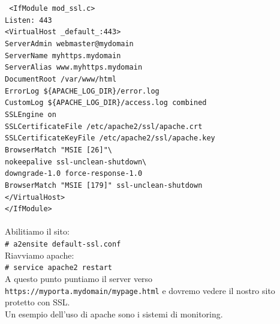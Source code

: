 \documentclass[a4paper]{report}
\newcommand\tab[1][1cm]{\hspace*{#1}}
\begin{document}
\texttt{
\tab <IfModule mod\_ssl.c>\\
\tab\tab Listen: 443\\
\tab\tab <VirtualHost \_default\_:443>\\
\tab\tab\tab ServerAdmin webmaster@mydomain\\
\tab\tab\tab ServerName myhttps.mydomain\\
\tab\tab\tab ServerAlias www.myhttps.mydomain\\
\tab\tab\tab DocumentRoot /var/www/html\\
\tab\tab\tab ErrorLog \$\{APACHE\_LOG\_DIR\}/error.log\\
\tab\tab\tab CustomLog \$\{APACHE\_LOG\_DIR\}/access.log combined\\
\tab\tab\tab SSLEngine on\\
\tab\tab\tab SSLCertificateFile /etc/apache2/ssl/apache.crt\\
\tab\tab\tab SSLCertificateKeyFile /etc/apache2/ssl/apache.key\\
\tab\tab\tab BrowserMatch "MSIE [26]"\textbackslash\\
\tab\tab\tab\tab nokeepalive ssl-unclean-shutdown\textbackslash\\
\tab\tab\tab\tab downgrade-1.0 force-response-1.0\\
\tab\tab\tab BrowserMatch "MSIE [179]" ssl-unclean-shutdown\\
\tab\tab</VirtualHost>\\
\tab</IfModule>\\
}\\
Abilitiamo il sito:\\
\tab\texttt{\# a2ensite default-ssl.conf}\\
Riavviamo apache:\\
\tab\texttt{\# service apache2 restart}\\
A questo punto puntiamo il server verso \texttt{https://myporta.mydomain/mypage.html} e dovremo vedere il nostro sito protetto con SSL.\\
Un esempio dell'uso di apache sono i sistemi di monitoring.\\
\end{document}
